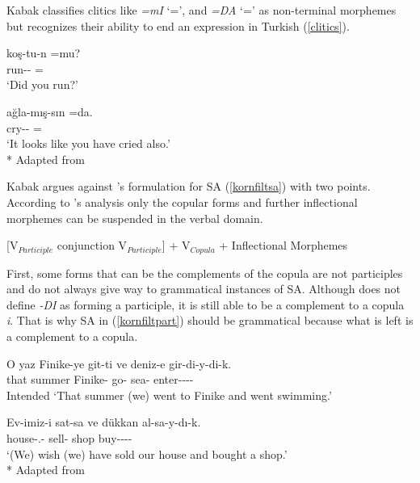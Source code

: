 Kabak classifies clitics like \textit{=mI} `={\Q}', and \textit{=DA} `{=\Foc}' as non-terminal morphemes but recognizes their ability to end an expression in Turkish (\ref{clitics}).

\begin{exe}
    \ex \label{clitics}

    \begin{xlist}
        \ex \gll koş-tu-n =mu? \\ 
        run-{{\Pst}}-{\Second}{\Sg} ={\Q} \\
        \glt `Did you run?'
  
        \ex \gll ağla-mış-sın =da. \\ cry-{\Evi}-{\Second}{\Sg} ={\Foc} \\ 
        \glt `It looks like you have cried also.'\\*
        \hfill Adapted from \citet{kabak2007turkish}
    \end{xlist}
\end{exe}

Kabak argues against \citet{kornfilt1996some}'s formulation for SA (\ref{kornfiltsa}) with two points. According to \citet{kornfilt1996some}'s analysis only the copular forms and further inflectional morphemes can be suspended in the verbal domain.
\begin{exe}
    \ex \label{kornfiltsa}
    [V$_{Participle}$ conjunction V$_{Participle}$] + V$_{Copula}$ + Inflectional Morphemes
\end{exe}

First, some forms that can be the complements of the copula are not participles and do not always give way to grammatical instances of SA. Although \citet{kornfilt1996some} does not define \textit{-DI} as forming a participle, it is still able to be a complement to a copula \textit{i}. That is why SA in (\ref{kornfiltpart}) should be grammatical because what is left is a complement to a copula.

\begin{exe}
    \ex \label{kornfiltpart}
    \begin{xlist}
        \ex \gll *O yaz Finike-ye git-ti ve deniz-e gir-di-y-di-k. \\ 
        that summer Finike-{\Dat} go-{{\Pst}} {\And} sea-{\Dat} enter-{{\Pst}}-{\Cop}-{{\Pst}}-{\Fpl} \\
        \glt Intended `That summer (we) went to Finike and went swimming.'
        
        \ex \gll *Ev-imiz-i sat-sa ve dükkan al-sa-y-dı-k. \\ 
        house-{\Poss}.{\Fpl}-{\Acc} sell-{\Cond} {\And} shop buy-{\Cond}-{\Cop}-{{\Pst}}-{\Fpl} \\
        \glt `(We) wish (we) have sold our house and bought a shop.'\\*
        \hfill Adapted from \citet{kabak2007turkish}
    \end{xlist}
\end{exe}

